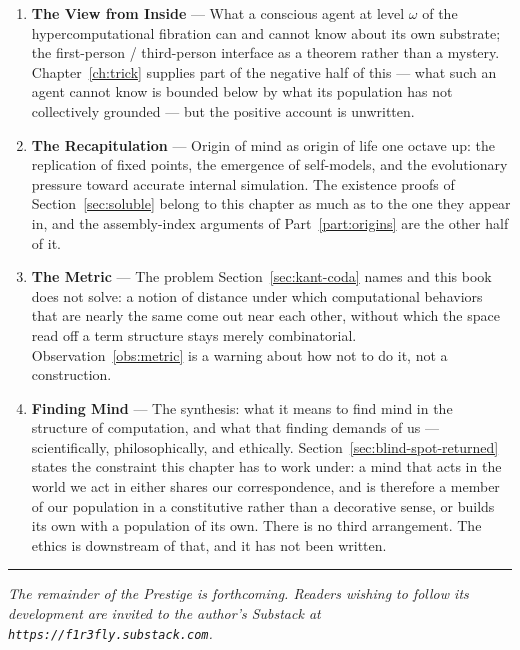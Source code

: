 \begin{enumerate}
  \item \textbf{The View from Inside} --- What a conscious agent at
        level $\omega$ of the hypercomputational fibration can and
        cannot know about its own substrate; the first-person /
        third-person interface as a theorem rather than a mystery.
        Chapter~\ref{ch:trick} supplies part of the negative half of
        this --- what such an agent cannot know is bounded below by
        what its population has not collectively grounded --- but the
        positive account is unwritten.
  \item \textbf{The Recapitulation} --- Origin of mind as origin of
        life one octave up: the replication of fixed points, the
        emergence of self-models, and the evolutionary pressure
        toward accurate internal simulation. The existence proofs of
        Section~\ref{sec:soluble} belong to this chapter as much as
        to the one they appear in, and the assembly-index arguments
        of Part~\ref{part:origins} are the other half of it.
  \item \textbf{The Metric} --- The problem
        Section~\ref{sec:kant-coda} names and this book does not
        solve: a notion of distance under which computational
        behaviors that are nearly the same come out near each other,
        without which the space read off a term structure stays
        merely combinatorial.
        Observation~\ref{obs:metric} is a warning about how not to do
        it, not a construction.
  \item \textbf{Finding Mind} --- The synthesis: what it means to
        find mind in the structure of computation, and what that
        finding demands of us --- scientifically, philosophically,
        and ethically. Section~\ref{sec:blind-spot-returned} states
        the constraint this chapter has to work under: a mind that
        acts in the world we act in either shares our correspondence,
        and is therefore a member of our population in a
        constitutive rather than a decorative sense, or builds its
        own with a population of its own. There is no third
        arrangement. The ethics is downstream of that, and it has not
        been written.
\end{enumerate}

\bigskip
\noindent\hrule
\bigskip

\noindent\textit{The remainder of the Prestige is forthcoming.
Readers wishing to follow its development are invited to the
author's Substack at \texttt{https://f1r3fly.substack.com}.}

